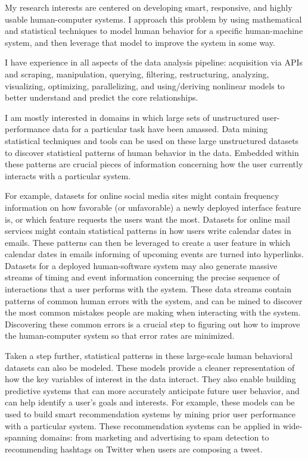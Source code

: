 My research interests are centered on developing smart, responsive, and highly usable human-computer systems.
I approach this problem by using mathematical and statistical techniques to model human behavior for a specific human-machine system, and then leverage that model to improve the system in some way.

I have experience in all aspects of the data analysis pipeline:
acquisition via APIs and scraping, manipulation, querying, filtering, restructuring, analyzing, visualizing, optimizing, parallelizing,
and using/deriving nonlinear models to better understand and predict the core relationships.

I am mostly interested in domains in which large sets of unstructured user-performance data for a particular task have been amassed.
Data mining statistical techniques and tools can be used on these large unstructured datasets to discover statistical patterns of human behavior in the data.
Embedded within these patterns are crucial pieces of information concerning how the user currently interacts with a particular system.

For example, datasets for online social media sites might contain frequency information on how favorable (or unfavorable) a newly deployed interface feature is,
or which feature requests the users want the most.
Datasets for online mail services might contain statistical patterns in how users write calendar dates in emails.
These patterns can then be leveraged to create a user feature in which calendar dates in emails informing of upcoming events are turned into hyperlinks.
Datasets for a deployed human-software system may also generate massive streams of timing and event information concerning the precise sequence of interactions that a user performs with the system.
These data streams contain patterns of common human errors with the system, and can be mined to discover the most common mistakes people are making when interacting with the system.
Discovering these common errors is a crucial step to figuring out how to improve the human-computer system so that error rates are minimized.

Taken a step further, statistical patterns in these large-scale human behavioral datasets can also be modeled.
These models provide a cleaner representation of how the key variables of interest in the data interact.
They also enable building predictive systems that can more accurately anticipate future user behavior, and can help identify a user's goals and interests.
For example, these models can be used to build smart recommendation systems by mining prior user performance with a particular system.
These recommendation systems can be applied in wide-spanning domains: from marketing and advertising to spam detection to recommending hashtags on Twitter when users are composing a tweet.

